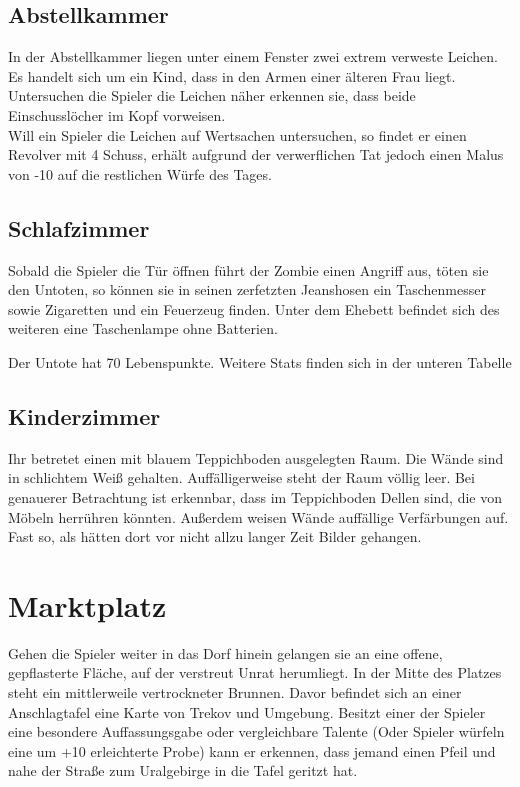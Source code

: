 \subsection{Abstellkammer}

In der Abstellkammer liegen unter einem Fenster zwei extrem verweste Leichen. Es handelt sich um ein Kind, dass in den Armen einer älteren Frau liegt. Untersuchen die Spieler die Leichen näher erkennen sie, dass beide Einschusslöcher im Kopf vorweisen.
\\Will ein Spieler die Leichen auf Wertsachen untersuchen, so findet er einen Revolver mit 4 Schuss, erhält aufgrund der verwerflichen Tat jedoch einen Malus von -10 auf die restlichen Würfe des Tages.

\subsection{Schlafzimmer}

Sobald die Spieler die Tür öffnen führt der Zombie einen Angriff aus, töten sie den Untoten, so können sie in seinen zerfetzten Jeanshosen ein Taschenmesser sowie Zigaretten und ein Feuerzeug finden.
Unter dem Ehebett befindet sich des weiteren eine Taschenlampe ohne Batterien.

Der Untote hat 70 Lebenspunkte. Weitere Stats finden sich in der unteren Tabelle

\begin{center}
  
\end{center}

\subsection{Kinderzimmer}

Ihr betretet einen mit blauem Teppichboden ausgelegten Raum. Die Wände sind in schlichtem Weiß gehalten. Auffälligerweise steht der Raum völlig leer. Bei genauerer Betrachtung ist erkennbar,
dass im Teppichboden Dellen sind, die von Möbeln herrühren könnten. Außerdem weisen Wände auffällige Verfärbungen auf. Fast so, als hätten dort vor nicht allzu langer Zeit Bilder gehangen.


\section{Marktplatz}

Gehen die Spieler weiter in das Dorf hinein gelangen sie an eine offene, gepflasterte Fläche, auf der verstreut Unrat herumliegt.
In der Mitte des Platzes steht ein mittlerweile vertrockneter Brunnen. Davor befindet sich an einer Anschlagtafel eine Karte von Trekov und Umgebung.
Besitzt einer der Spieler eine besondere Auffassungsgabe oder vergleichbare Talente (Oder Spieler würfeln eine um +10 erleichterte Probe) kann er erkennen, dass jemand einen Pfeil und  nahe der Straße zum Uralgebirge in die Tafel geritzt hat.

